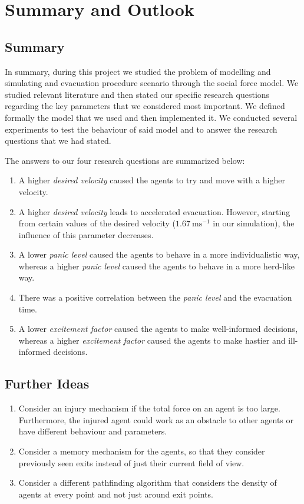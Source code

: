 \section{Summary and Outlook} \label{sec:7-summary}
\subsection{Summary}
In summary, during this project we studied the problem of modelling and simulating and evacuation procedure scenario through the social force model. We studied relevant literature and then stated our specific research questions regarding the key parameters that we considered most important. We defined formally the model that we used and then implemented it. We conducted several experiments to test the behaviour of said model and to answer the research questions that we had stated.

The answers to our four research questions are summarized below:
\begin{enumerate}
	\item A higher \emph{desired velocity} caused the agents to try and move with a higher velocity.
	
	\item A higher \emph{desired velocity} leads to accelerated evacuation. However, starting from certain values of the desired velocity ($\SI{1.67}{\meter\second^{-1}}$ in our simulation), the influence of this parameter decreases.
	
	\item A lower \emph{panic level} caused the agents to behave in a more individualistic way, whereas a higher \emph{panic level} caused the agents to behave in a more herd-like way.
	
	\item There was a positive correlation between the \emph{panic level} and the evacuation time.
	
	\item A lower \emph{excitement factor} caused the agents to make well-informed decisions, whereas a higher \emph{excitement factor} caused the agents to make hastier and ill-informed decisions.
\end{enumerate}

\subsection{Further Ideas}
\begin{enumerate}
	\item Consider an injury mechanism if the total force on an agent is too large. Furthermore, the injured agent could work as an obstacle to other agents or have different behaviour and parameters.
	
	\item Consider a memory mechanism for the agents, so that they consider previously seen exits instead of just their current field of view.
	
	\item Consider a different pathfinding algorithm that considers the density of agents at every point and not just around exit points.
\end{enumerate}